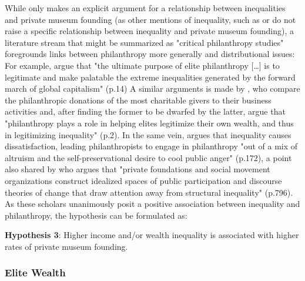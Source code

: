 \documentclass[11pt]{article}
\begin{document}
While only \textcite{Brown_2019_private}  makes an explicit argument for a relationship between inequalities and private museum founding (as other mentions of inequality, such as \textcite{KalbCosmo_2020_museum} or \textcite{Adam_2021_rise} do not raise a specific relationship between inequality and private museum founding), a literature stream that might be summarized as "critical philanthropy studies" foregrounds links between philanthropy more generally and distributional issues:
For example, \textcite{Maclean_etal_2021_philanthropy} argue that "the ultimate purpose of elite philanthropy [\ldots{}] is to legitimate and make palatable the extreme inequalities generated by the forward march of global capitalism" (p.14)
A similar arguments is made by \textcite{Glucksberg_RussellPrywata_2020_philanthropy}, who compare the philanthropic donations of the most charitable givers to their business activities and, after finding the former to be dwarfed by the latter, argue that "philanthropy plays a role in helping elites legitimize their own wealth, and thus in legitimizing inequality" (p.2).
In the same vein, \textcite{Giridharadas_2018_winners} argues that inequality causes dissatisfaction, leading philanthropists to engage in philanthropy "out of a mix of altruism and the self-preservational desire to cool public anger" (p.172), a point also shared by \textcite{KohlArenas_2015_selfhelp} who argues that "private foundations and social movement organizations construct idealized spaces of public participation and discourse theories of change that draw attention away from structural inequality" (p.796). 
As these scholars unanimously posit a positive association between inequality and philanthropy, the hypothesis can be formulated as: 

\bigbreak
\noindent
\textbf{Hypothesis 3}: Higher income and/or wealth inequality is associated with higher rates of private museum founding.



\subsubsection*{Elite Wealth}
\end{document}

